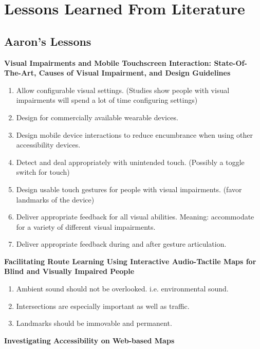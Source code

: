 \documentclass{article}
\begin{document}
\section{Lessons Learned From Literature}


\subsection{Aaron's Lessons}
\cite{} \textbf{Visual Impairments and Mobile Touchscreen Interaction: State-Of-The-Art, Causes of Visual Impairment, and Design Guidelines} \cite{}
\begin{enumerate}
    \item Allow configurable visual settings. (Studies show people with visual impairments will spend a lot of time configuring settings) 
    \item Design for commercially available wearable devices. 
    \item Design mobile device interactions to reduce encumbrance when using other accessibility devices.
    \item Detect and deal appropriately with unintended touch. (Possibly a toggle switch for touch) 
    \item Design usable touch gestures for people with visual impairments. (favor landmarks of the device)
    \item Deliver appropriate feedback for all visual abilities. Meaning: accommodate for a variety of different visual impairments.
    \item Deliver appropriate feedback during and after gesture articulation.
\end{enumerate}

\cite{} \textbf{Facilitating Route Learning Using Interactive Audio-Tactile Maps for Blind and Visually Impaired People } \cite{}

\begin{enumerate}
    \item Ambient sound should not be overlooked. i.e. environmental sound.
    \item Intersections are especially important as well as traffic. 
    \item Landmarks should be immovable and permanent. 
\end{enumerate}

\cite{} \textbf{Investigating Accessibility on Web-based Maps } \cite{}
\end{document}
